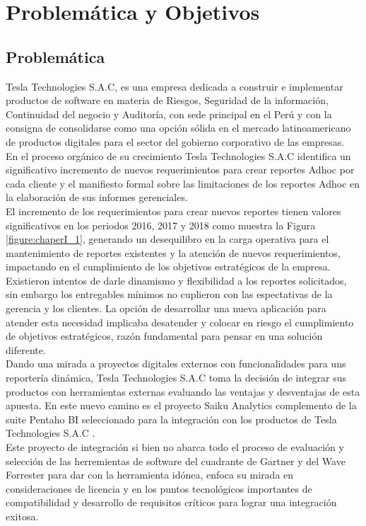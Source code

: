 \chapter{Problemática y Objetivos} \label{chapter:I}
\section{Problem\'{a}tica}
\begin{spacing}{1.5}	
	Tesla Technologies S.A.C, es una empresa dedicada a construir e implementar productos de software en materia de Riesgos, Seguridad de la información, Continuidad del negocio y Auditoría, con sede principal en el Perú y con la consigna de consolidarse como una opci\'{o}n s\'{o}lida en el mercado latinoamericano de productos digitales para el sector del gobierno corporativo de las empresas.\\	                         
	En el proceso org\'{a}nico de su crecimiento Tesla Technologies S.A.C  identifica un significativo incremento de nuevos requerimientos para crear reportes Adhoc por cada cliente y el manifiesto formal sobre las limitaciones de los reportes Adhoc en la elaboraci\'{o}n de sus informes gerenciales.\\
	El incremento de los requerimientos para crear nuevos reportes tienen valores significativos en los periodos 2016, 2017 y 2018 como muestra la Figura \ref{figure:chaperI_1}, generando un desequilibro en la carga operativa para el mantenimiento de reportes existentes y la atenci\'{o}n de nuevos requerimientos, impactando en el cumplimiento de los objetivos estrat\'{e}gicos de la empresa.\\
	Existieron intentos de darle dinamismo y flexibilidad a los reportes solicitados, sin embargo los entregables m\'{i}nimos no cuplieron con las espectativas de la gerencia y los clientes. La opci\'{o}n de desarrollar una nueva aplicaci\'{o}n para atender esta necesidad implicaba desatender y colocar en riesgo el cumplimiento de objetivos estrat\'{e}gicos, raz\'{o}n fundamental para pensar en una soluci\'{o}n diferente.\\
	Dando una mirada a proyectos digitales externos con funcionalidades para uns reporter\'{i}a din\'{a}mica, Tesla Technologies S.A.C toma la decisi\'{o}n de integrar sus productos con herramientas externas evaluando las ventajas y desventajas de esta apuesta. En este nuevo camino es el proyecto Saiku Analytics complemento de la suite Pentaho BI seleccionado para la integración con los productos de Tesla Technologies S.A.C .\\	
	Este proyecto de integraci\'{o}n si bien no abarca todo el proceso de evaluaci\'{o}n y selecci\'{o}n de  las herremientas de software del cuadrante de Gartner y del Wave Forrester para dar con la herramienta id\'{o}nea, enfoca su mirada en consideraciones de licencia y en los puntos tecnol\'{o}gicos importantes de compatibilidad y desarrollo de requisitos cr\'{i}ticos para lograr una integraci\'{o}n exitosa.\\
	

\end{spacing}
